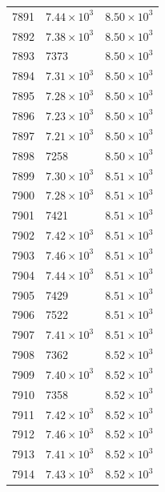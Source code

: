 \begin{table}[H]
\begin{tabular}{lll}
7891 & $\displaystyle 7.44 \times 10^{3}$ & $\displaystyle 8.50 \times 10^{3}$ \\
7892 & $\displaystyle 7.38 \times 10^{3}$ & $\displaystyle 8.50 \times 10^{3}$ \\
7893 & 7373 & $\displaystyle 8.50 \times 10^{3}$ \\
7894 & $\displaystyle 7.31 \times 10^{3}$ & $\displaystyle 8.50 \times 10^{3}$ \\
7895 & $\displaystyle 7.28 \times 10^{3}$ & $\displaystyle 8.50 \times 10^{3}$ \\
7896 & $\displaystyle 7.23 \times 10^{3}$ & $\displaystyle 8.50 \times 10^{3}$ \\
7897 & $\displaystyle 7.21 \times 10^{3}$ & $\displaystyle 8.50 \times 10^{3}$ \\
7898 & 7258 & $\displaystyle 8.50 \times 10^{3}$ \\
7899 & $\displaystyle 7.30 \times 10^{3}$ & $\displaystyle 8.51 \times 10^{3}$ \\
7900 & $\displaystyle 7.28 \times 10^{3}$ & $\displaystyle 8.51 \times 10^{3}$ \\
7901 & 7421 & $\displaystyle 8.51 \times 10^{3}$ \\
7902 & $\displaystyle 7.42 \times 10^{3}$ & $\displaystyle 8.51 \times 10^{3}$ \\
7903 & $\displaystyle 7.46 \times 10^{3}$ & $\displaystyle 8.51 \times 10^{3}$ \\
7904 & $\displaystyle 7.44 \times 10^{3}$ & $\displaystyle 8.51 \times 10^{3}$ \\
7905 & 7429 & $\displaystyle 8.51 \times 10^{3}$ \\
7906 & 7522 & $\displaystyle 8.51 \times 10^{3}$ \\
7907 & $\displaystyle 7.41 \times 10^{3}$ & $\displaystyle 8.51 \times 10^{3}$ \\
7908 & 7362 & $\displaystyle 8.52 \times 10^{3}$ \\
7909 & $\displaystyle 7.40 \times 10^{3}$ & $\displaystyle 8.52 \times 10^{3}$ \\
7910 & 7358 & $\displaystyle 8.52 \times 10^{3}$ \\
7911 & $\displaystyle 7.42 \times 10^{3}$ & $\displaystyle 8.52 \times 10^{3}$ \\
7912 & $\displaystyle 7.46 \times 10^{3}$ & $\displaystyle 8.52 \times 10^{3}$ \\
7913 & $\displaystyle 7.41 \times 10^{3}$ & $\displaystyle 8.52 \times 10^{3}$ \\
7914 & $\displaystyle 7.43 \times 10^{3}$ & $\displaystyle 8.52 \times 10^{3}$ \\

\end{tabular}
\end{table}
